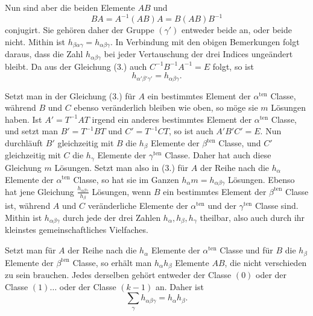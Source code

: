 \documentclass[11pt]{article}
\begin{document}
Nun sind aber die beiden Elemente $AB$ und
\begin{equation*}\tag{4.}
BA=A^{-1}(AB)A=B(AB)B^{-1}
\end{equation*}
conjugirt. Sie gehören daher der Gruppe $(\gamma')$ entweder beide an, oder beide nicht. Mithin ist $h_{\beta\alpha\gamma}=h_{\alpha\beta\gamma}$. In Verbindung mit den obigen Bemerkungen folgt daraus, dass die Zahl $h_{\alpha\beta\gamma}$ bei jeder Vertauschung der drei Indices ungeändert bleibt. Da aus der Gleichung (3.) auch $C^{-1}B^{-1}A^{-1}=E$ folgt, so ist
\begin{equation*}\tag{5.}
h_{\alpha'\beta'\gamma'}=h_{\alpha\beta\gamma}.
\end{equation*}

Setzt man in der Gleichung (3.) für $A$ ein bestimmtes Element der $\alpha^{\mathrm{ten}}$ Classe, während $B$ und $C$ ebenso veränderlich bleiben wie oben, so möge sie $m$ Lösungen haben. Ist $A'=T^{-1}AT$ irgend ein anderes bestimmtes Element der $\alpha^{\mathrm{ten}}$ Classe, und setzt man $B'=T^{-1}BT$ und $C'=T^{-1}CT$, so ist auch $A'B'C'=E$. Nun durchläuft $B'$ gleichzeitig mit $B$ die $h_\beta$ Elemente der $\beta^{\mathrm{ten}}$ Classe, und $C'$ gleichzeitig mit $C$ die $h_\gamma$ Elemente der $\gamma^{\mathrm{ten}}$ Classe. Daher hat auch diese Gleichung $m$ Lösungen. Setzt man also in (3.) für $A$ der Reihe nach die $h_\alpha$ Elemente der $\alpha^{\mathrm{ten}}$ Classe, so hat sie im Ganzen $h_\alpha m=h_{\alpha\beta\gamma}$ Lösungen. Ebenso hat jene Gleichung $\frac{h_{\alpha\beta\gamma}}{h_\beta}$ Lösungen, wenn $B$ ein bestimmtes Element der $\beta^{\mathrm{ten}}$ Classe ist, während $A$ und $C$ veränderliche Elemente der $\alpha^{\mathrm{ten}}$ und der $\gamma^{\mathrm{ten}}$ Classe sind. Mithin ist $h_{\alpha\beta\gamma}$ durch jede der drei Zahlen $h_\alpha,h_\beta,h_\gamma$ theilbar, also auch durch ihr kleinstes gemeinschaftliches Vielfaches.

Setzt man für $A$ der Reihe nach die $h_\alpha$ Elemente der $\alpha^{\mathrm{ten}}$ Classe und für $B$ die $h_\beta$ Elemente der $\beta^{\mathrm{ten}}$ Classe, so erhält man $h_\alpha h_\beta$ Elemente $AB$, die nicht verschieden zu sein brauchen. Jedes derselben gehört entweder der Classe $(0)$ oder der Classe $(1)\ldots$ oder der Classe $(k-1)$ an. Daher ist
\begin{equation*}\tag{6.}
\sum_\gamma h_{\alpha\beta\gamma}=h_\alpha h_\beta.
\end{equation*}
\end{document}
